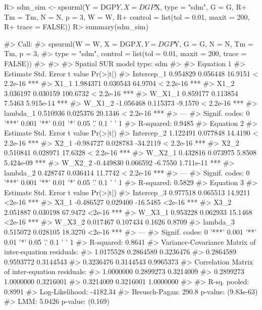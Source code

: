 \documentclass[article]{jss}
\begin{document}
\begin{CodeChunk}

\begin{CodeInput}
R> sdm_sim <- spsurml(Y = DGP$Y, X = DGP$X, type = "sdm", G = G, 
R+                    Tm = Tm, N = N, p = 3, W = W, 
R+                    control = list(tol = 0.01, maxit = 200, 
R+                                   trace = FALSE))
R> summary(sdm_sim)
\end{CodeInput}

\begin{CodeOutput}
#> Call:
#> spsurml(W = W, X = DGP$X, Y = DGP$Y, G = G, N = N, Tm = Tm, p = 3, 
#>     type = "sdm", control = list(tol = 0.01, maxit = 200, trace = FALSE))
#> 
#>  
#> Spatial SUR model type:  sdm 
#> 
#> Equation  1 
#>             Estimate Std. Error  t value  Pr(>|t|)    
#> Intercep_1  0.954829   0.056448  16.9151 < 2.2e-16 ***
#> X1_1        1.984371   0.030543  64.9704 < 2.2e-16 ***
#> X1_2        3.036197   0.030159 100.6732 < 2.2e-16 ***
#> W_X1_1      0.859177   0.113854   7.5463 5.915e-14 ***
#> W_X1_2     -1.056468   0.115373  -9.1570 < 2.2e-16 ***
#> lambda_1    0.510936   0.025376  20.1346 < 2.2e-16 ***
#> ---
#> Signif. codes:  0 '***' 0.001 '**' 0.01 '*' 0.05 '.' 0.1 ' ' 1
#> R-squared: 0.9485 
#>   Equation  2 
#>             Estimate Std. Error  t value  Pr(>|t|)    
#> Intercep_2  1.122491   0.077848  14.4190 < 2.2e-16 ***
#> X2_1       -0.984727   0.028783 -34.2119 < 2.2e-16 ***
#> X2_2        0.510841   0.028971  17.6328 < 2.2e-16 ***
#> W_X2_1      0.432816   0.073975   5.8508 5.424e-09 ***
#> W_X2_2     -0.449830   0.066592  -6.7550 1.711e-11 ***
#> lambda_2    0.428747   0.036414  11.7742 < 2.2e-16 ***
#> ---
#> Signif. codes:  0 '***' 0.001 '**' 0.01 '*' 0.05 '.' 0.1 ' ' 1
#> R-squared: 0.5829 
#>   Equation  3 
#>             Estimate Std. Error  t value Pr(>|t|)    
#> Intercep_3  0.977518   0.065513  14.9211   <2e-16 ***
#> X3_1       -0.486527   0.029400 -16.5485   <2e-16 ***
#> X3_2        2.051887   0.030198  67.9472   <2e-16 ***
#> W_X3_1      0.953228   0.062933  15.1468   <2e-16 ***
#> W_X3_2      0.017467   0.107434   0.1626   0.8709    
#> lambda_3    0.515072   0.028105  18.3270   <2e-16 ***
#> ---
#> Signif. codes:  0 '***' 0.001 '**' 0.01 '*' 0.05 '.' 0.1 ' ' 1
#> R-squared: 0.8641 
#>   Variance-Covariance Matrix of inter-equation residuals:                              
#>  1.0175528 0.2864589 0.3236476
#>  0.2864589 0.9593772 0.3144543
#>  0.3236476 0.3144543 0.9965373
#> Correlation Matrix of inter-equation residuals:                              
#>  1.0000000 0.2899273 0.3214009
#>  0.2899273 1.0000000 0.3216001
#>  0.3214009 0.3216001 1.0000000
#> 
#>  R-sq. pooled: 0.8991 
#>  Log-Likelihood:  -4182.34
#>  Breusch-Pagan: 290.8  p-value: (9.83e-63) 
#>  LMM: 5.0426  p-value: (0.169)
\end{CodeOutput}
\end{CodeChunk}
\end{document}
